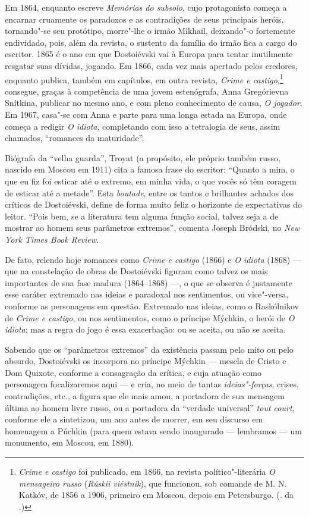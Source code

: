 Em 1864, enquanto escreve \emph{Memórias do subsolo}, cujo
protagonista começa a encarnar cruamente os paradoxos e as
contradições de seus principais heróis, tornando"-se seu
protótipo, morre"-lhe o irmão Mikhail, deixando"-o fortemente
endividado, pois, além da revista, o sustento da família do
irmão fica a cargo do escritor. 1865 é o ano em que Dostoiévski
vai à Europa para tentar inutilmente resgatar suas dívidas,
jogando. Em 1866, cada vez mais apertado pelos credores, enquanto
publica, também em capítulos, em outra revista, \emph{Crime e
castigo},\footnote{\emph{Crime e castigo} foi publicado, em 1866,
na revista político"-literária \emph{O mensageiro russo}
(\emph{Rúskii viéstnik}), que funcionou, sob comande de M. N.
Katkóv, de 1856 a 1906, primeiro em Moscou, depois em Petersburgo.
(. da .)} consegue, graças à competência de uma jovem
estenógrafa, Anna Gregórievna Snítkina, publicar no mesmo ano,
e com pleno conhecimento de causa, \emph{O jogador}. Em 1967,
casa"-se com Anna e parte para uma longa estada na Europa, onde
começa a redigir \emph{O idiota}, completando com isso a
tetralogia de seus, assim chamados, ``romances da maturidade''.

Biógrafo da ``velha guarda'', Troyat (a propósito, ele próprio
também russo, nascido em Moscou em 1911) cita a famosa frase
do escritor: ``Quanto a mim, o que eu fiz foi esticar até o
extremo, em minha vida, o que vocês só têm coragem de esticar até
a metade''. Esta \emph{boutade}, entre os tantos e brilhantes achados
dos críticos de Dostoiévski, define de forma muito feliz o
horizonte de expectativas do leitor. ``Pois bem, se a
literatura tem alguma função social, talvez seja a de mostrar
ao homem seus parâmetros extremos'', comenta Joseph Bródski,
no \emph{New York Times Book Review}.

De fato, relendo hoje romances como \emph{Crime e castigo}
(1866) e \emph{O idiota} (1868) --- que na constelação de
obras de Dostoiévski figuram como talvez os mais importantes
de sua fase madura (1864--1868) ---, o que se observa é
justamente esse caráter extremado nas ideias e paradoxal
nos sentimentos, ou vice"-versa, conforme as personagens em
questão. Extremado nas ideias, como o Raskólnikov de
\emph{Crime e castigo}, ou nos sentimentos, como o príncipe
Mýchkin, o herói de \emph{O idiota}; mas a regra do jogo é essa
exacerbação: ou se aceita, ou não se aceita. 

Sabendo que os ``parâmetros
extremos'' da existência passam pelo mito ou pelo absurdo, Dostoiévski
os incorpora no príncipe Mýchkin --- mescla de Cristo e Dom Quixote,
conforme a consagração da crítica, e cuja atuação como personagem
focalizaremos aqui --- e cria, no meio de tantas \emph{ideias"-forças},
crises, contradições, etc., a figura que ele mais amou,
a portadora de sua mensagem última ao homem livre russo, ou
a portadora da ``verdade universal'' \emph{tout court},
conforme ele a sintetizou, um ano antes de morrer, em seu
discurso em homenagem a Púchkin (para quem estava sendo
inaugurado --- lembramos --- um monumento, em Moscou, em 1880).

